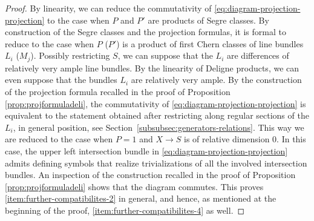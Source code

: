 \begin{proof}
By linearity, we can reduce the commutativity of \eqref{eq:diagram-projection-projection} to the case when $P$ and $P'$ are products of Segre classes. By construction of the Segre classes and the projection formulas, it is formal to reduce to the case when $P$ (\resp $P'$) is a product of first Chern classes of line bundles $L_i$ (\resp $M_j$). Possibly restricting $S$, we can suppose that the $L_{i}$ are differences of relatively very ample line bundles. By the linearity of Deligne products, we can even suppose that the bundles $L_i$ are relatively very ample. By the construction of the projection formula recalled in the proof of Proposition \ref{prop:projformuladeli}, the commutativity of \eqref{eq:diagram-projection-projection} is equivalent to the statement obtained after restricting along regular sections of the $L_i$, in general position, see Section~\ref{subsubsec:generators-relations}. This way we are reduced to the case when $P=1$ and $X \to S$ is of relative dimension 0. In this case, the upper left intersection bundle in \eqref{eq:diagram-projection-projection} admits defining symbols that realize trivializations of all the involved intersection bundles. An inspection of the construction recalled in the proof of Proposition \ref{prop:projformuladeli} shows that the diagram commutes. This proves \eqref{item:further-compatibilites-2} in general, and hence, as mentioned at the beginning of the proof, \eqref{item:further-compatibilites-4} as well.


\end{proof}
